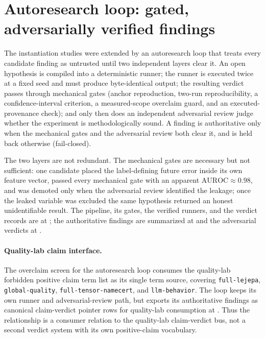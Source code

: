 \section{Autoresearch loop: gated, adversarially verified findings}
\label{sec:bedc-jepa-autoresearch}

The instantiation studies were extended by an autoresearch loop that treats
every candidate finding as untrusted until two independent layers clear it.  An
open hypothesis is compiled into a deterministic runner; the runner is executed
twice at a fixed seed and must produce byte-identical output; the resulting
verdict passes through mechanical gates (anchor reproduction, two-run
reproducibility, a confidence-interval criterion, a measured-scope overclaim
guard, and an executed-provenance check); and only then does an independent
adversarial review judge whether the experiment is methodologically sound.  A
finding is authoritative only when the mechanical gates and the adversarial
review both clear it, and is held back otherwise (fail-closed).

The two layers are not redundant.  The mechanical gates are necessary but not
sufficient: one candidate placed the label-defining future error inside its own
feature vector, passed every mechanical gate with an apparent
$\mathrm{AUROC} \approx 0.98$, and was demoted only when the adversarial review
identified the leakage; once the leaked variable was excluded the same
hypothesis returned an honest unidentifiable result.  The pipeline, its gates,
the verified runners, and the verdict records are at
; the authoritative findings are
summarized at
and the adversarial verdicts at
.

\paragraph{Quality-lab claim interface.}
The overclaim screen for the autoresearch loop consumes the quality-lab
forbidden positive claim term list as its single term source, covering
\texttt{full-lejepa}, \texttt{global-quality},
\texttt{full-tensor-namecert}, and \texttt{llm-behavior}.  The loop keeps its
own runner and adversarial-review path, but exports its authoritative findings
as canonical claim-verdict pointer rows for quality-lab consumption at
.
Thus the relationship is a consumer relation to the quality-lab claim-verdict
bus, not a second verdict system with its own positive-claim vocabulary.

